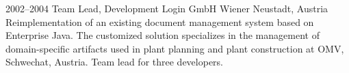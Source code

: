\cventry
{2002--2004}
{Team Lead, Development}
{}
{Login GmbH}
{Wiener Neustadt, Austria}
{
  Reimplementation of an existing document management system based on
  Enterprise Java. The customized solution specializes in the management
  of domain-specific artifacts used in plant planning and plant construction at
  OMV, Schwechat, Austria. Team lead for three developers.
}
